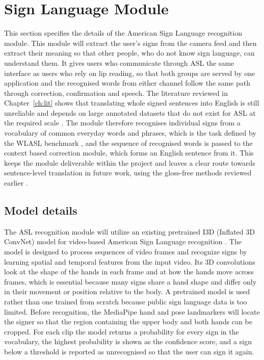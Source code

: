 \documentclass{FastFyp}
\begin{document}
\section{Sign Language Module}
This section specifies the details of the American Sign Language recognition module. This module will extract the user's signs from the camera feed and then extract their meaning so that other people, who do not know sign language, can understand them. It gives users who communicate through ASL the same interface as users who rely on lip reading, so that both groups are served by one application and the recognised words from either channel follow the same path through correction, confirmation and speech. The literature reviewed in Chapter~\ref{ch:lit} shows that translating whole signed sentences into English is still unreliable and depends on large annotated datasets that do not exist for ASL at the required scale \cite{ref:Camgoz:2018,ref:Uthus:2023}. The module therefore recognises individual signs from a vocabulary of common everyday words and phrases, which is the task defined by the WLASL benchmark \cite{ref:Li:2020}, and the sequence of recognised words is passed to the context based correction module, which forms an English sentence from it. This keeps the module deliverable within the project and leaves a clear route towards sentence-level translation in future work, using the gloss-free methods reviewed earlier \cite{ref:ZhouB:2023}.

\subsection{Model details}
\label{sec:signmodel}
The ASL recognition module will utilize an existing pretrained I3D (Inflated 3D ConvNet) model for video-based American Sign Language recognition \cite{2024SPIE13077E..02C}. The model is designed to process sequences of video frames and recognize signs by learning spatial and temporal features from the input video. Its 3D convolutions look at the shape of the hands in each frame and at how the hands move across frames, which is essential because many signs share a hand shape and differ only in their movement or position relative to the body. 
A pretrained model is used rather than one trained from scratch because public sign language data is too limited. Before recognition, the MediaPipe hand and pose landmarkers \cite{lugaresi2019mediapipe} will locate the signer so that the region containing the upper body and both hands can be cropped. For each clip the model returns a probability for every sign in the vocabulary, the highest probability is shown as the confidence score, and a sign below a threshold is reported as unrecognised so that the user can sign it again.
\end{document}
